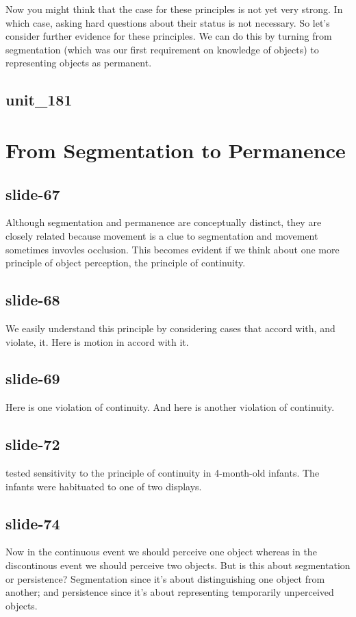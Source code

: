 \documentclass[12pt,\papersize]{extarticle}
\begin{document}
Now you might think that the case for these principles is not yet very strong.
In which case, asking hard questions about their status is not necessary.
So let’s consider further evidence for these principles.
We can do this by turning from segmentation (which was our first requirement on knowledge of objects) to representing objects as permanent.
 
 
\subsection{unit\_181}
 
\section{From Segmentation to Permanence}
 
 
\subsection{slide-67}
Although segmentation and permanence are conceptually distinct, they are closely related because movement is a clue to segmentation and movement sometimes invovles occlusion.
This becomes evident if we think about one more principle of object perception, the principle of continuity.
 
 
\subsection{slide-68}
We easily understand this principle by considering cases that accord with, and violate, it.
Here is motion in accord with it.
 
 
\subsection{slide-69}
Here is one violation of continuity.
And here is another violation of continuity.
 
 
\subsection{slide-72}
\citet{spelke:1995_spatiotemporal} tested sensitivity to the principle of continuity in 4-month-old infants.
The infants were habituated to one of two displays.
 
 
\subsection{slide-74}
Now in the continuous event we should perceive one object whereas in the discontinous event we should perceive two objects.
But is this about segmentation or persistence?
Segmentation since it's about distinguishing one object from another; and persistence since it's about representing temporarily unperceived objects.
 
\end{document}
